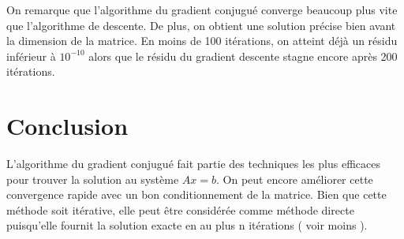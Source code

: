 \documentclass[french]{article}
\begin{document}
On remarque que l'algorithme du gradient conjugué converge beaucoup
plus vite que l'algorithme de descente. De plus, on obtient une solution
précise bien avant la dimension de la matrice. En moins de 100 itérations,
on atteint déjà un résidu inférieur à $10^{-10}$ alors que le résidu
du gradient descente stagne encore après 200 itérations. \nocite{Amodei2008-gp}\nocite{Meurisse2018-fj}\nocite{Magoules2017-tb}

\newpage{}

\part{Conclusion}

L'algorithme du gradient conjugué fait partie des techniques les plus
efficaces pour trouver la solution au système $Ax=b$. On peut encore
améliorer cette convergence rapide avec un bon conditionnement de
la matrice. Bien que cette méthode soit itérative, elle peut être
considérée comme méthode directe puisqu'elle fournit la solution exacte
en au plus n itérations ( voir moins ).

\newpage{}



\end{document}
